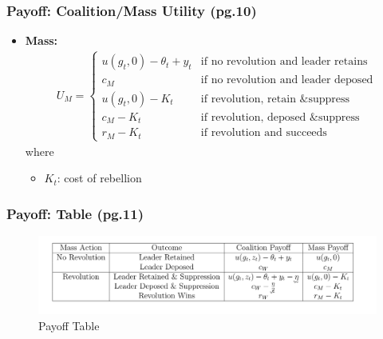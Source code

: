 \documentclass[10pt,handout]{beamer}
\begin{document}
\begin{frame}
\frametitle{Payoff: Coalition/Mass Utility (pg.10)}
\begin{itemize}
    \item[] \textbf{Mass:}
    \begin{align*}
        U_M = 
        \begin{cases}
            u(g_t, 0) - \theta_t + y_t &\text{if no revolution and leader retains} \\
            c_M &\text{if no revolution and leader deposed} \\
            u(g_t, 0) - K_t &\text{if revolution, retain \& suppress} \\
            c_M - K_t &\text{if revolution, deposed \& suppress} \\
            r_M - K_t &\text{if revolution and succeeds}
        \end{cases}
    \end{align*}
    where
    \begin{itemize}
        \item $K_t$: cost of rebellion
    \end{itemize}
\end{itemize}
\end{frame}


\begin{frame}
\frametitle{Payoff: Table (pg.11)}
\begin{figure}
    \centering
    \includegraphics[width=1.1\linewidth]{Table1.jpeg}
    \caption{Payoff Table}
    \label{fig:enter-label}
\end{figure}
\end{frame}
\end{document}
